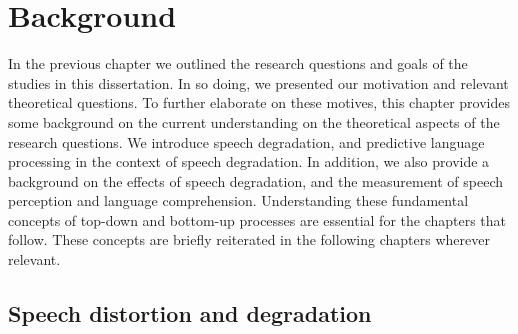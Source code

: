\documentclass[a4paper, nobind]{templates/ociamthesis}
\begin{document}
\hypertarget{background}{%
\chapter{Background}\label{background}}

\minitoc 

In the previous chapter we outlined the research questions and goals of the studies in this dissertation.
In so doing, we presented our motivation and relevant theoretical questions.
To further elaborate on these motives, this chapter provides some background on the current understanding on the theoretical aspects of the research questions.
We introduce speech degradation, and predictive language processing in the context of speech degradation.
In addition, we also provide a background on the effects of speech degradation, and the measurement of speech perception and language comprehension.
Understanding these fundamental concepts of top-down and bottom-up processes are essential for the chapters that follow.
These concepts are briefly reiterated in the following chapters wherever relevant.

\hypertarget{speech-distortion-and-degradation}{%
\section{Speech distortion and degradation}\label{speech-distortion-and-degradation}}
\end{document}
